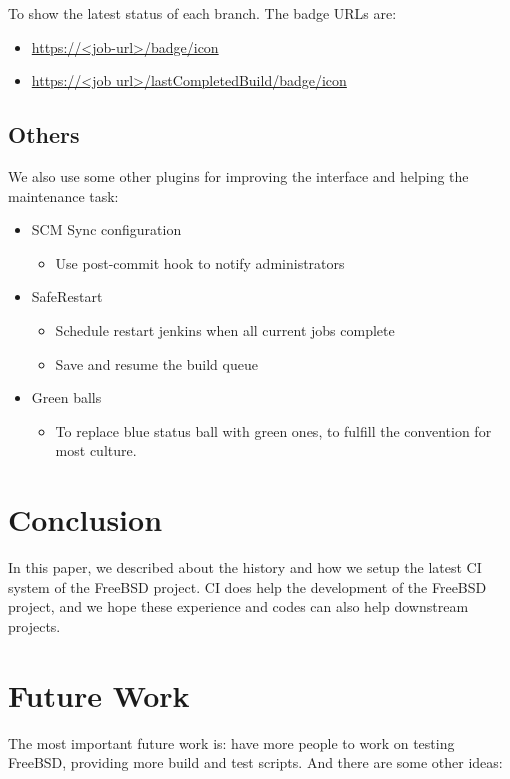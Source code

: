 \documentclass[a4paper,twocolumn,10pt]{article}
\begin{document}
To show the latest status of each branch. The badge URLs are:
\begin{itemize}
\item \url{https://<job-url>/badge/icon}
\item \url{https://<job url>/lastCompletedBuild/badge/icon}
\end{itemize}

\subsection{Others}

We also use some other plugins for improving the interface and helping the
maintenance task:

\begin{itemize}
\item SCM Sync configuration
  \begin{itemize}
  \item Use post-commit hook to notify administrators
  \end{itemize}
\item SafeRestart
  \begin{itemize}
  \item Schedule restart jenkins when all current jobs complete
  \item Save and resume the build queue
  \end{itemize}
\item Green balls
  \begin{itemize}
  \item To replace blue status ball with green ones, to fulfill the convention
        for most culture.
  \end{itemize}
\end{itemize}

\section{Conclusion}

In this paper, we described about the history and how we setup the latest CI
system of the FreeBSD project.  CI does help the development of the FreeBSD
project, and we hope these experience and codes can also help downstream
projects.

\section{Future Work}

The most important future work is: have more people to work on testing FreeBSD,
providing more build and test scripts. And there are some other ideas:
\end{document}
